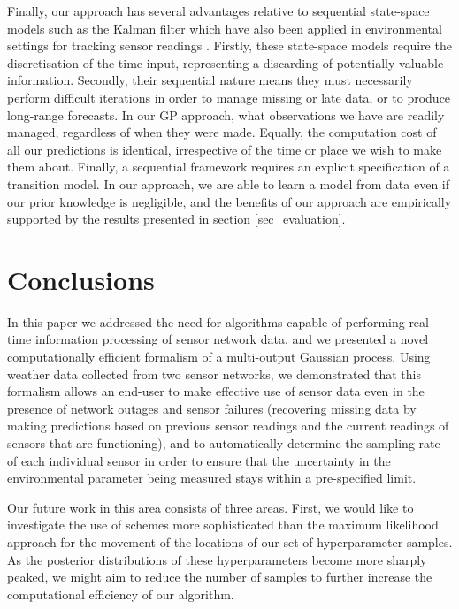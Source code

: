 \documentclass{acmtrans2m}
\begin{document}
Finally, our approach has several advantages relative to sequential state-space models such as the Kalman filter \cite{Girard,Jazwinski} which have also been applied in environmental settings for tracking sensor readings \cite{kalman_oceanography}. Firstly, these state-space models require the discretisation of the time input, representing a discarding of potentially valuable information. Secondly, their sequential nature means they must necessarily perform difficult iterations in order to manage missing or late data, or to produce long-range forecasts. In our GP approach, what observations we have are readily managed, regardless of when they were made. Equally, the computation cost of all our predictions is identical, irrespective of the time or place we wish to make them about. Finally, a sequential framework requires an explicit specification of a transition model. In our approach, we are able to learn a model from data even if our prior knowledge is negligible, and the benefits of our approach are empirically supported by the results presented in section \ref{sec_evaluation}.

\section{Conclusions}\label{sec_conclusion}

\noindent In this paper we addressed the need for algorithms capable of performing real-time information processing of sensor network data, and we presented a novel computationally efficient formalism of a multi-output Gaussian process. Using weather data collected from two sensor networks, we demonstrated that this formalism allows an end-user to make effective use of sensor data even in the presence of network outages and sensor failures (recovering missing data by making predictions based on previous sensor readings and the current readings of sensors that are functioning), and to automatically determine the sampling rate of each individual sensor in order to ensure that the uncertainty in the environmental parameter being measured stays within a pre-specified limit.

Our future work in this area consists of three areas. First, we would like to investigate the use of schemes more sophisticated than the maximum likelihood approach for the movement of the locations of our set of hyperparameter samples. As the posterior distributions of these hyperparameters become more sharply peaked, we might aim to reduce the number of samples to further increase the computational efficiency of our algorithm.
\end{document}
